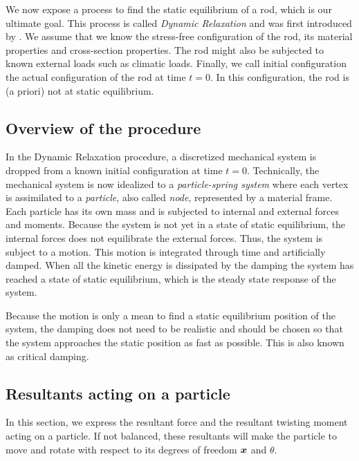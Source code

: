 We now expose a process to find the static equilibrium of a rod, which is our ultimate goal. This process is called \emph{Dynamic Relaxation} and was first introduced by . We assume that we know the stress-free configuration of the rod, its material properties and cross-section properties. The rod might also be subjected to known external loads such as climatic loads. Finally, we call initial configuration the actual configuration of the rod at time $t=0$. In this configuration, the rod is (a priori) not at static equilibrium.

\subsection{Overview of the procedure}
In the Dynamic Relaxation procedure, a discretized mechanical system is dropped from a known initial configuration at time $t=0$. Technically, the mechanical system is now idealized to a \emph{particle-spring system} where each vertex is assimilated to a \emph{particle}, also called \emph{node}, represented by a material frame. Each particle has its own mass and is subjected to internal and external forces and moments. Because the system is not yet in a state of static equilibrium, the internal forces does not equilibrate the external forces. Thus, the system is subject to a motion. This motion is integrated through time and artificially damped. When all the kinetic energy is dissipated by the damping the system has reached a state of static equilibrium, which is the steady state response of the system.

Because the motion is only a mean to find a static equilibrium position of the system, the damping does not need to be realistic and should be chosen so that the system approaches the static position as fast as possible. This is also known as critical damping.

\subsection{Resultants acting on a particle}\label{sec:resFM}
In this section, we express the resultant force and the resultant twisting moment acting on a particle. If not balanced, these resultants will make the particle to move and rotate with respect to its degrees of freedom $\boldsymbol{x}$ and $\theta$.

